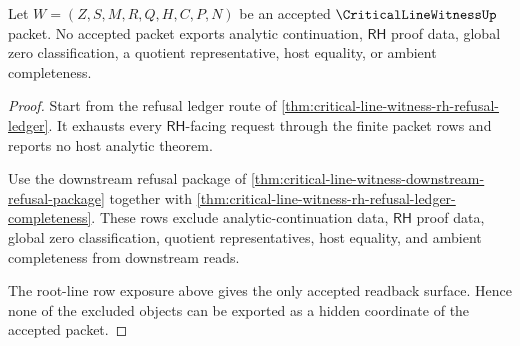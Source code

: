 \begin{theorem}
\label{thm:critical-line-witness-analytic-continuation-nonescape}
Let $W=(Z,S,M,R,Q,H,C,P,N)$ be an accepted $\CriticalLineWitnessUp$ packet.
No accepted packet exports analytic continuation, $\mathsf{RH}$ proof data,
global zero classification, a quotient representative, host equality, or
ambient completeness.
\end{theorem}
\begin{proof}
Start from the refusal ledger route of
\autoref{thm:critical-line-witness-rh-refusal-ledger}. It exhausts every
$\mathsf{RH}$-facing request through the finite packet rows and reports no host
analytic theorem.

Use the downstream refusal package of
\autoref{thm:critical-line-witness-downstream-refusal-package} together with
\autoref{thm:critical-line-witness-rh-refusal-ledger-completeness}. These rows
exclude analytic-continuation data, $\mathsf{RH}$ proof data, global zero
classification, quotient representatives, host equality, and ambient
completeness from downstream reads.

The root-line row exposure above gives the only accepted readback surface.
Hence none of the excluded objects can be exported as a hidden coordinate of
the accepted packet.
\end{proof}
